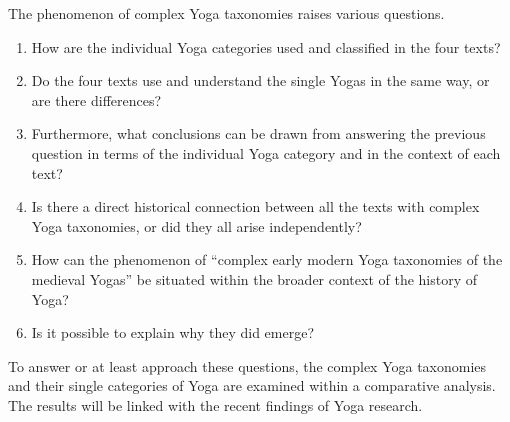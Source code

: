 The phenomenon of complex Yoga taxonomies raises various questions.
\begin{enumerate}
\item How are the individual Yoga categories used and classified in the four texts?
  \item Do the four texts use and understand the single Yogas in the same way, or are there differences?
  \item Furthermore, what conclusions can be drawn from answering the previous question in terms of the individual Yoga category and in the context of each text?
  \item Is there a direct historical connection between all the texts with complex Yoga taxonomies, or did they all arise independently?
  \item How can the phenomenon of ``complex early modern Yoga taxonomies of the medieval Yogas'' be situated within the broader context of the history of Yoga?
  \item Is it possible to explain why they did emerge? 
\end{enumerate}

To answer or at least approach these questions, the complex Yoga taxonomies and their single categories of Yoga are examined within a comparative analysis. The results will be linked with the recent findings of Yoga research.

